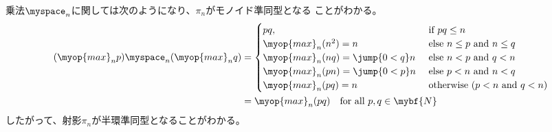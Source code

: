 	乗法$\myspace_n$に関しては次のようになり、$\pi_n$がモノイド準同型となる
	ことがわかる。
	\begin{equation*}\begin{split} %
		(\myop{max}_np)\myspace_n(\myop{max}_nq) &= \begin{cases}
			pq, &\text{ if }pq\le n \\
			\myop{max}_n(n^2) = n &\text{ else }n\le p\text{ and }n\le q \\
			\myop{max}_n(nq) = \jump{0<q}n &\text{ else }n<p\text{ and }q<n  \\
			\myop{max}_n(pn) = \jump{0<p}n &\text{ else }p<n\text{ and }n<q  \\
			\myop{max}_n(pq) = n &\text{ otherwise }(p<n\text{ and }q<n) \\
		\end{cases} \\
		&= \myop{max}_n(pq) \quad\text{for all }p,q\in\mybf{N}
	\end{split}\end{equation*} %
	したがって、射影$\pi_n$が半環準同型となることがわかる。

